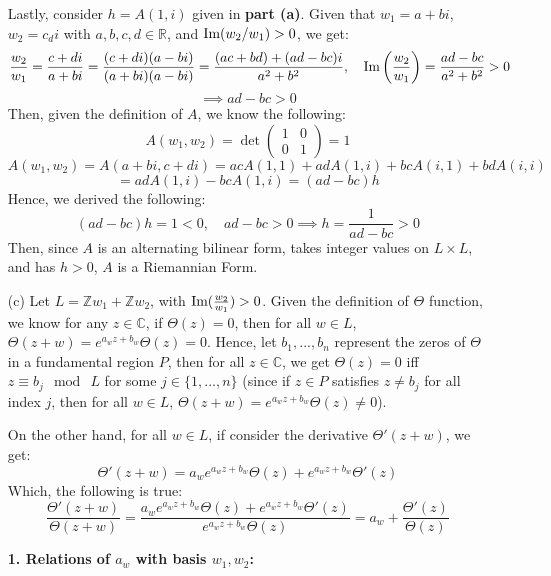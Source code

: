 \documentclass{article}
\begin{document}
\begin{itemize}
    Lastly, consider $h=A(1,i)$ given in \textbf{part (a)}. Given that $w_1=a+bi$, $w_2=c_di$ with $a,b,c,d\in\mathbb{R}$, and $\textmd{Im}(w_2/w_1)>0$, we get:
    $$\frac{w_2}{w_1}=\frac{c+di}{a+bi}=\frac{(c+di)(a-bi)}{(a+bi)(a-bi)} = \frac{(ac+bd)+(ad-bc)i}{a^2+b^2},\quad \textmd{Im}\left(\frac{w_2}{w_1}\right)=\frac{ad-bc}{a^2+b^2}>0$$
    $$\implies ad-bc > 0$$
    Then, given the definition of $A$, we know the following:
    $$A(w_1,w_2) = \det\begin{pmatrix}1&0\\0&1\end{pmatrix} = 1$$
    $$A(w_1,w_2)=A(a+bi,c+di) = acA(1,1)+ adA(1,i)+bcA(i,1)+bdA(i,i)$$
    $$ = adA(1,i)-bcA(1,i) = (ad-bc)h$$
    Hence, we derived the following:
    $$(ad-bc)h = 1 <0,\quad ad-bc >0\implies h = \frac{1}{ad-bc}>0$$
    Then, since $A$ is an alternating bilinear form, takes integer values on $L\times L$, and has $h>0$, $A$ is a Riemannian Form.

    \hfil

    \item[(c)] Let $L=\mathbb{Z}w_1+\mathbb{Z}w_2$, with $\textmd{Im}(\frac{w_2}{w_1})>0$. Given the definition of $\Theta$ function, we know for any $z\in \mathbb{C}$, if $\Theta(z)=0$, then for all $w\in L$, $\Theta(z+w)=e^{a_wz+b_w}\Theta(z) = 0$. Hence, let $b_1,...,b_n$ represent the zeros of $\Theta$ in a fundamental region $P$, then for all $z\in\mathbb{C}$, we get $\Theta(z)=0$ iff $z\equiv b_j\mod\ L$ for some $j\in\{1,...,n\}$ (since if $z\in P$ satisfies $z\neq b_j$ for all index $j$, then for all $w\in L$, $\Theta(z+w)=e^{a_wz+b_w}\Theta(z)\neq 0$).
    
    On the other hand, for all $w\in L$, if consider the derivative $\Theta'(z+w)$, we get:
    $$\Theta'(z+w) = a_we^{a_wz+b_w}\Theta(z) + e^{a_wz+b_w}\Theta'(z)$$
    Which, the following is true:
    $$\frac{\Theta'(z+w)}{\Theta(z+w)}=\frac{a_we^{a_wz+b_w}\Theta(z) + e^{a_wz+b_w}\Theta'(z)}{e^{a_wz+b_w}\Theta(z)} = a_w+\frac{\Theta'(z)}{\Theta(z)}$$

    \hfil

    \textbf{1. Relations of $a_w$ with basis $w_1,w_2$:}


\end{itemize}
\end{document}
